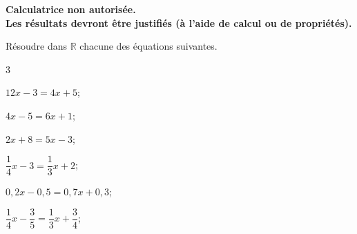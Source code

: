 \documentclass[11pt,a4paper]{article}  %
\begin{document}
	\graphicspath{{images/}}
	
	
	\vspace{.5cm}
	
	\begin{center}
		
		
	\end{center}

\begin{center}\textbf{Calculatrice non autorisée.\\Les résultats devront être justifiés (à l'aide de calcul ou de propriétés).}\end{center}




Résoudre dans $\mathbb{R}$ chacune des équations suivantes.
\begin{multicols}{3}
	\begin{enumMet}
		\item $12 x-3=4x+5$;
		\item $4 x-5=6 x+1$;
		
		\columnbreak
		\item $2x+8=5x-3$;
		\item $\dfrac{1}{4}x-3=\dfrac{1}{3}x+2$;
		
		\columnbreak
		\item $0,2 x-0,5=0,7x+0,3$;
		\item $\dfrac{1}{4} x-\dfrac{3}{5}=\dfrac{1}{3} x+\dfrac{3}{4}$;
	\end{enumMet}
\end{multicols}
\end{document}
